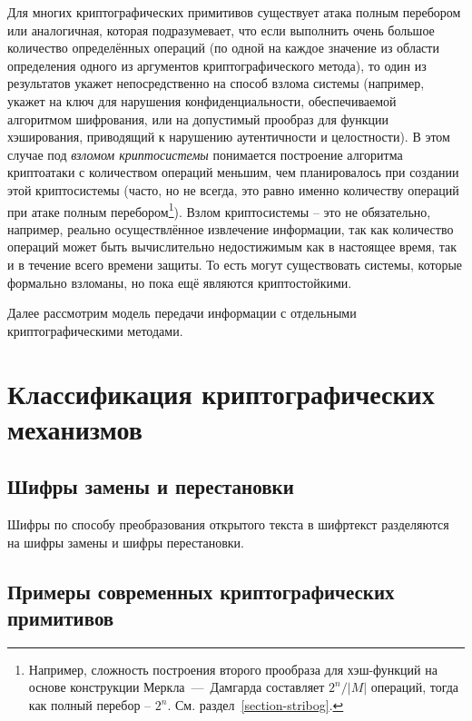 Для многих криптографических примитивов существует атака полным перебором или аналогичная, которая подразумевает, что если выполнить очень большое количество определённых операций (по одной на каждое значение из области определения одного из аргументов криптографического метода), то один из результатов укажет непосредственно на способ взлома системы (например, укажет на ключ для нарушения конфиденциальности, обеспечиваемой алгоритмом шифрования, или на допустимый прообраз для функции хэширования, приводящий к нарушению аутентичности и целостности). В этом случае под \emph{взломом криптосистемы} понимается построение алгоритма криптоатаки с количеством операций меньшим, чем планировалось при создании этой криптосистемы (часто, но не всегда, это равно именно количеству операций при атаке полным перебором\footnote{Например, сложность построения второго прообраза для хэш-функций на основе конструкции Меркла~---~Дамгарда составляет $2^n / \left|M\right|$ операций, тогда как полный перебор -- $2^n$. См. раздел~\ref{section-stribog}.}). Взлом криптосистемы – это не обязательно, например, реально осуществлённое извлечение информации, так как количество операций может быть вычислительно недостижимым как в настоящее время, так и в течение всего времени защиты. То есть могут существовать системы, которые формально взломаны, но пока ещё являются криптостойкими.

Далее рассмотрим модель передачи информации с отдельными криптографическими методами.



\section[Классификация]{Классификация криптографических механизмов}


\subsection{Шифры замены и перестановки}

Шифры по способу преобразования открытого текста в шифртекст разделяются на шифры замены и шифры перестановки.







\subsection{Примеры современных криптографических примитивов}

